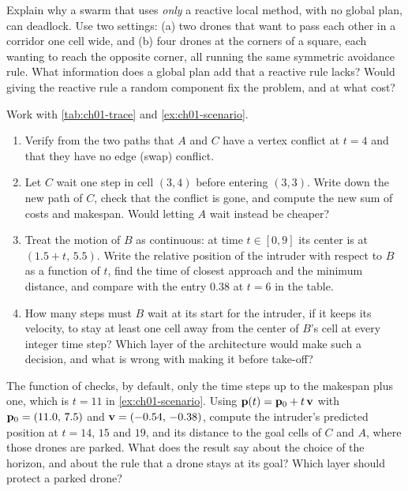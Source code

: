 \begin{exercise}[\difficulty{2}]
\label{exr:ch01-deadlock}
Explain why a swarm that uses \emph{only} a reactive local method, with no global
plan, can deadlock. Use two settings: (a) two drones that want to pass each other in a
corridor one cell wide, and (b) four drones at the corners of a square, each wanting
to reach the opposite corner, all running the same symmetric avoidance rule. What
information does a global plan add that a reactive rule lacks? Would giving the
reactive rule a random component fix the problem, and at what cost?
\end{exercise}

\begin{exercise}[\difficulty{2}]
\label{exr:ch01-trace}
Work with \cref{tab:ch01-trace} and \cref{ex:ch01-scenario}.
\begin{enumerate}[label=(\alph*)]
  \item Verify from the two paths that $A$ and $C$ have a vertex conflict at $t=4$
        and that they have no edge (swap) conflict.
  \item Let $C$ wait one step in cell $(3,4)$ before entering $(3,3)$. Write down the
        new path of $C$, check that the conflict is gone, and compute the new sum of
        costs and makespan. Would letting $A$ wait instead be cheaper?
  \item Treat the motion of $B$ as continuous: at time $t\in[0,9]$ its center is at
        $(1.5+t,\,5.5)$. Write the relative position of the intruder with respect to
        $B$ as a function of $t$, find the time of closest approach and the minimum
        distance, and compare with the entry $0.38$ at $t=6$ in the table.
  \item How many steps must $B$ wait at its start for the intruder, if it keeps its
        velocity, to stay at least one cell away from the center of $B$'s cell at every
        integer time step? Which layer of the architecture would make such a decision,
        and what is wrong with making it before take-off?
\end{enumerate}
\end{exercise}

\begin{exercise}[\difficulty{2}]
\label{exr:ch01-horizon}
The function  of  checks, by
default, only the time steps up to the makespan plus one, which is $t=11$ in
\cref{ex:ch01-scenario}. Using $\mathbf{p}(t)=\mathbf{p}_0+t\,\mathbf{v}$ with $\mathbf{p}_0=(11.0,\,7.5)$ and
$\mathbf{v}=(-0.54,\,-0.38)$, compute the intruder's predicted position at $t=14$, $15$ and
$19$, and its distance to the goal cells of $C$ and $A$, where those drones are
parked. What does the result say about the choice of the horizon, and about the rule
that a drone stays at its goal? Which layer should protect a parked drone?
\end{exercise}

